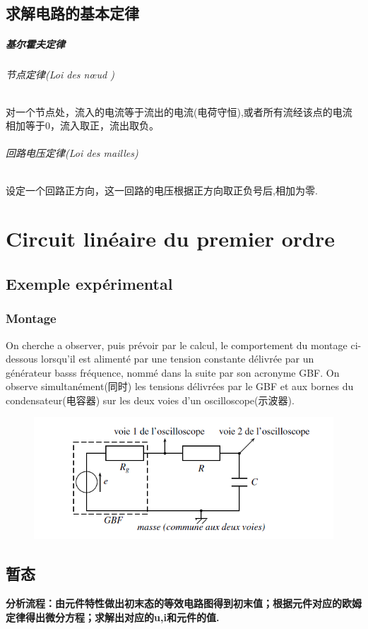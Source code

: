 \documentclass[12pt]{book}
\theoremstyle{definition}\newtheorem{dfn}{Définition}[chapter]
\theoremstyle{plain}\newtheorem{thm}{Théorème}[chapter]
\theoremstyle{plain}\newtheorem{prp}{Proposition}[chapter]
\theoremstyle{plain}\newtheorem{lem}{\bf Lemme}[chapter]
\theoremstyle{plain}\newtheorem{axm}{\bf Axiome}[chapter]
\theoremstyle{plain}\newtheorem{lmm}{\bf Lemme}[chapter]
\theoremstyle{plain}\newtheorem{cor}{\bf Corollaire}[chapter]
\theoremstyle{remark}\newtheorem{rem}{Remarque}[chapter]
\begin{document}
\section{求解电路的基本定律}
\paragraph{基尔霍夫定律}
\subparagraph{节点定律(Loi des nœud )}对一个节点处，流入的电流等于流出的电流(电荷守恒),或者所有流经该点的电流相加等于0，流入取正，流出取负。
\subparagraph{回路电压定律(Loi des mailles)}设定一个回路正方向，这一回路的电压根据正方向取正负号后,相加为零.

\chapter{Circuit linéaire du premier ordre}
\section{Exemple expérimental}
\subsection{Montage}
On cherche a observer, puis prévoir par le  calcul, le comportement du montage ci-dessous
lorsqu'il est alimenté par une tension constante délivrée par un générateur basss fréquence, nommé dans la suite par son acronyme GBF. On observe simultanément(同时) les tensions délivrées par le GBF et aux bornes du condensateur(电容器) sur les deux voies d'un oscilloscope(示波器).
\begin{figure}[H]
	\centering
	\includegraphics[scale=0.7]{Circuit lineaire du premier ordre//1}
\end{figure}

\section{暂态}
\textbf{分析流程：由元件特性做出初末态的等效电路图得到初末值；根据元件对应的欧姆定律得出微分方程；求解出对应的u,i和元件的值.}
\end{document}
